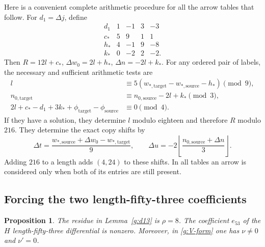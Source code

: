 \documentclass[11pt]{article}
\newtheorem{proposition}[theorem]{Proposition}
\theoremstyle{definition}
\theoremstyle{remark}
\numberwithin{equation}{section}
\begin{document}
Here is a convenient complete arithmetic procedure for all
the arrow tables that follow.  For $d_1=\Delta j$, define
\begin{equation}\label{g:arrow-rule}
\begin{array}{c|rrrr}
 d_1&1&-1&3&-3\\\hline
 c_*&5&9&1&1\\
 h_*&4&-1&9&-8\\
 k_*&0&-2&2&-2.
\end{array}
\end{equation}
Then $R=12l+c_*$, $\Delta w_0=2l+h_*$,
$\Delta n=-2l+k_*$.  For any ordered pair of labels,
the necessary and sufficient arithmetic tests are
\begin{align}
 l&\equiv5(w_{*,\mathrm{target}}-w_{*,\mathrm{source}}-h_*)
       \pmod9,\label{g:l-congruence}\\
 n_{0,\mathrm{target}}&\equiv n_{0,\mathrm{source}}-2l+k_*
       \pmod3,\label{g:n-congruence}\\
 2l+c_*-d_1+3k_*+\phi_{\mathrm{target}}
       -\phi_{\mathrm{source}}&\equiv0\pmod4.
       \label{g:four-congruence}
\end{align}
If they have a solution, they determine $l$ modulo eighteen
and therefore $R$ modulo $216$.  They determine the exact
copy shifts by
\begin{equation}\label{g:copy-shifts}
 \Delta t=\frac{w_{*,\mathrm{source}}+\Delta w_0
                    -w_{*,\mathrm{target}}}{9},
 \qquad
 \Delta u=-2\left\lfloor
       \frac{n_{0,\mathrm{source}}+\Delta n}{3}
                    \right\rfloor.
\end{equation}
Adding $216$ to a length adds $(4,24)$ to these shifts.
In all tables an arrow is considered only when both of its
entries are still present.

\subsection{Forcing the two length-fifty-three coefficients}

\begin{proposition}\label{g:rho-and-e53}
The residue in Lemma~\ref{g:d13} is $\rho=8$.
The coefficient $e_{53}$ of the $H$ length-fifty-three
differential is nonzero.  Moreover, in \eqref{g:V-form}
one has $\nu\ne0$ and $\nu'=0$.
\end{proposition}
\end{document}
